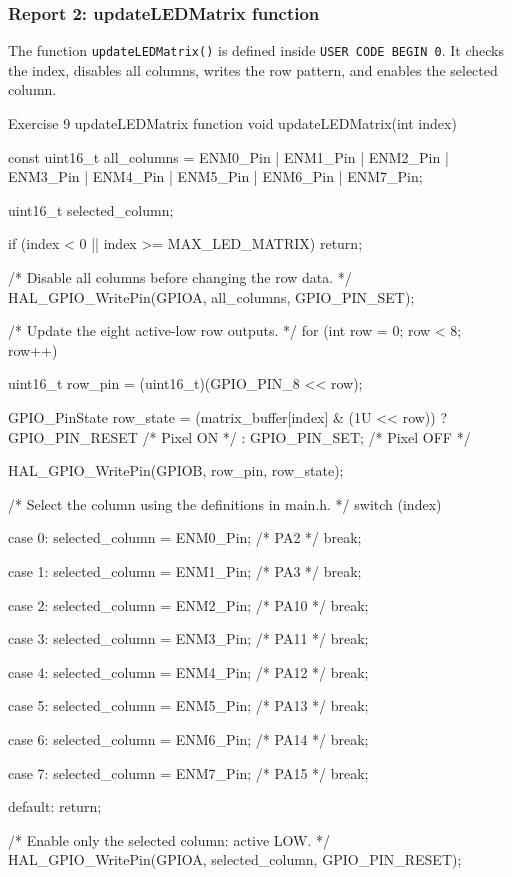 \documentclass[a4paper]{article}
\begin{document}
\subsubsection{Report 2: updateLEDMatrix function}

The function \texttt{updateLEDMatrix()}
is defined inside \texttt{USER CODE BEGIN 0}.
It checks the index, disables all columns,
writes the row pattern, and enables the
selected column.

\begin{stmcode}{Exercise 9 updateLEDMatrix function}
void updateLEDMatrix(int index) {
  const uint16_t all_columns = ENM0_Pin | ENM1_Pin | ENM2_Pin | ENM3_Pin |
                               ENM4_Pin | ENM5_Pin | ENM6_Pin | ENM7_Pin;

  uint16_t selected_column;

  if (index < 0 || index >= MAX_LED_MATRIX) {
    return;
  }

  /* Disable all columns before changing the row data. */
  HAL_GPIO_WritePin(GPIOA, all_columns, GPIO_PIN_SET);

  /* Update the eight active-low row outputs. */
  for (int row = 0; row < 8; row++) {
    uint16_t row_pin = (uint16_t)(GPIO_PIN_8 << row);

    GPIO_PinState row_state = (matrix_buffer[index] & (1U << row))
                                  ? GPIO_PIN_RESET /* Pixel ON */
                                  : GPIO_PIN_SET;  /* Pixel OFF */

    HAL_GPIO_WritePin(GPIOB, row_pin, row_state);
  }

  /* Select the column using the definitions in main.h. */
  switch (index) {
  case 0:
    selected_column = ENM0_Pin; /* PA2 */
    break;

  case 1:
    selected_column = ENM1_Pin; /* PA3 */
    break;

  case 2:
    selected_column = ENM2_Pin; /* PA10 */
    break;

  case 3:
    selected_column = ENM3_Pin; /* PA11 */
    break;

  case 4:
    selected_column = ENM4_Pin; /* PA12 */
    break;

  case 5:
    selected_column = ENM5_Pin; /* PA13 */
    break;

  case 6:
    selected_column = ENM6_Pin; /* PA14 */
    break;

  case 7:
    selected_column = ENM7_Pin; /* PA15 */
    break;

  default:
    return;
  }

  /* Enable only the selected column: active LOW. */
  HAL_GPIO_WritePin(GPIOA, selected_column, GPIO_PIN_RESET);
}
\end{stmcode}
\end{document}
